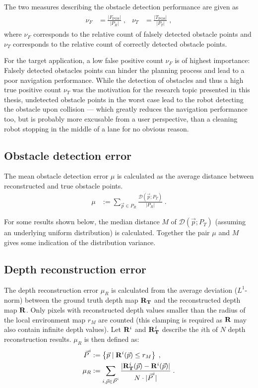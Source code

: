 The two measures describing the obstacle detection performance are given as
\begin{align}
\begin{aligned}
  \nu_F &= \frac{|F_{\mathrm{POS}}|}{|P_R|} \; ,&
  \nu_T &= \frac{|T_{\mathrm{POS}}|}{|P_T|} \; ,
\end{aligned}
\end{align}
where $\nu_F$ corresponds to the relative count of falsely detected obstacle points and $\nu_T$ corresponds to the relative count of correctly detected obstacle points.

For the target application, a low false positive count $\nu_F$ is of highest importance: Falsely detected obstacles points can hinder the planning process and lead to a poor navigation performance. While the detection of obstacles and thus a high true positive count $\nu_T$ was the motivation for the research topic presented in this thesis, undetected obstacle points in the worst case lead to the robot detecting the obstacle upon collision --- which greatly reduces the navigation performance too, but is probably more excusable from a user perspective, than a cleaning robot stopping in the middle of a lane for no obvious reason.

\subsection{Obstacle detection error}
The mean obstacle detection error $\mu$ is calculated as the average distance between reconstructed and true obstacle points.
\begin{align}
  \mu &:= \sum_{\vec p \in P_R} \frac{\mathcal{D}(\vec p; P_T)}{|P_R|} \;.
\end{align}

For some results shown below, the median distance $M$ of $\mathcal{D}(\vec p; P_T)$ (assuming an underlying uniform distribution) is calculated. Together the pair $\mu$ and $M$ gives some indication of the distribution variance.

\subsection{Depth reconstruction error}
The depth reconstruction error $\mu_R$ is calculated from the average deviation ($L^1$-norm) between the ground truth depth map $\mathbf{R_T}$ and the reconstructed depth map $\mathbf{R}$. Only pixels with reconstructed depth values smaller than the radius of the local environment map $r_M$ are counted (this clamping is required as $\mathbf{R}$ may also contain infinite depth values). Let $\mathbf{R}^i$ and $\mathbf{R_T^{\mathit{i}}}$ describe the $i$th of $N$ depth reconstruction results. $\mu_R$ is then defined as:
\begin{align}
\begin{aligned}
    \vec P^i &:= \left\{ \vec p \mid \img{R}^i(\vec p) \leq r_M \right\} \; , \\
    \mu_R &:= \sum_{i, \vec p \in \vec P^i} \frac{|\img{R^{\mathit{i}}_T}(\vec p) - \img{R}^i(\vec p)|}{N \cdot |\vec P^i|} \; .
\end{aligned}
\end{align}

